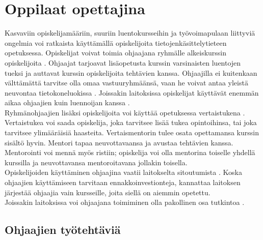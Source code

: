 \documentclass[finnish]{tktltiki2}
\theoremstyle{definition}
\theoremstyle{remark}
\begin{document}
\section{Oppilaat opettajina}
Kasvaviin opiskelijamääriin, suuriin luentokursseihin ja työvoimapulaan liittyviä ongelmia voi ratkaista käyttämällä opiskelijoita tietojenkäsittelytieteen opetuksessa. Opiskelijat voivat toimia ohjaajana ryhmälle alkeiskurssin o\-pis\-ke\-li\-joi\-ta \cite{Reges88}. Ohjaajat tarjoavat lisäopetusta kurssin varsinaisten luentojen tueksi ja auttavat kurssin opiskelijoita tehtävien kanssa. Ohjaajilla ei kuitenkaan välttämättä tarvitse olla omaa vastuuryhmäänsä, vaan he voivat antaa yleistä neuvontaa tietokoneluokissa \cite{Vikberg, Vihavainen}. Joissakin laitoksissa opiskelijat käyttävät enemmän aikaa ohjaajien kuin luennoijan kanssa \cite{Patitsas12_3}.
\\
Ryhmänohjaajien lisäksi opiskelijoita voi käyttää opetuksessa vertaistukena \cite{Tashakkori05}. Vertaistukea voi saada opiskelija, joka tarvitsee lisää tukea opintoihinsa, tai joka tarvitsee ylimääräisiä haasteita. Vertaismentorin tulee osata opettamansa  kurssin sisältö hyvin. Mentori tapaa neuvottavaansa ja avustaa tehtävien kanssa. Mentorointi voi mennä myös ristiin; opiskelija voi olla mentorina toiselle yhdellä kurssilla ja neuvottavansa mentoroitavana jollakin toisella.
\\
Opiskelijoiden käyttäminen ohjaajina vaatii laitokselta sitoutumista \cite{Kopp00}. Koska ohjaajien käyttämiseen tarvitaan ennakkoinvestionteja, kannattaa laitoksen järjestää ohjaajia vain kursseille, joita siellä on aiemmin opetettu. 
\\
Joissakin laitoksissa voi ohjaajana toimiminen olla pakollinen osa tutkintoa \cite{Kay95}.


\subsection{Ohjaajien työtehtäviä}
\end{document}
